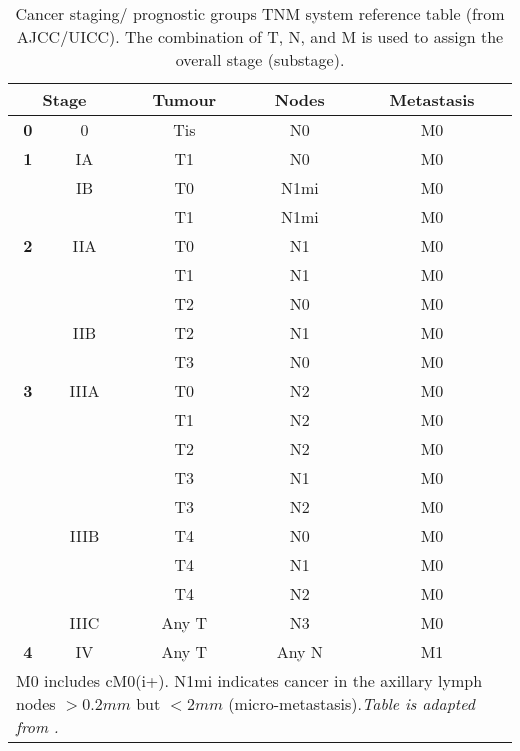         \begin{table}[!h]
        \centering
        \footnotesize
        \caption[Cancer staging/ prognostic groups TNM system reference table (from AJCC/UICC)]{Cancer staging/ prognostic groups TNM system reference table (from AJCC/UICC). The combination of T, N, and M is used to assign the  overall stage (substage).}
        \label{table:tnmstage}
        \begin{tabular}{c|c|c|c|c}
        \multicolumn{2}{c|}{\textbf{\small Stage}} & \textbf{Tumour} & \textbf{Nodes} & \textbf{Metastasis} \\ \hline
        \textbf{0} & 0 & Tis & N0 & M0 \\ \hline
        \textbf{1} & IA & T1 & N0 & M0 \\ \hline
        \textbf{} & IB & T0 & N1mi & M0 \\ \cline{2-5} 
        \textbf{} &  & T1 & N1mi & M0 \\ \hline
        \textbf{2} & IIA & T0 & N1 & M0 \\ \hline
        \textbf{} &  & T1 & N1 & M0 \\ \cline{2-5} 
        \textbf{} &  & T2 & N0 & M0 \\ \cline{2-5} 
        \textbf{} & IIB & T2 & N1 & M0 \\ \cline{2-5} 
        \textbf{} &  & T3 & N0 & M0 \\ \hline
        \textbf{3} & IIIA & T0 & N2 & M0 \\ \hline
         &  & T1 & N2 & M0 \\ \cline{2-5} 
         &  & T2 & N2 & M0 \\ \cline{2-5} 
         &  & T3 & N1 & M0 \\ \cline{2-5} 
         &  & T3 & N2 & M0 \\ \cline{2-5} 
         & IIIB & T4 & N0 & M0 \\ \cline{2-5} 
         &  & T4 & N1 & M0 \\ \cline{2-5} 
         &  & T4 & N2 & M0 \\ \cline{2-5} 
         & IIIC & Any T & N3 & M0 \\ \hline
        \textbf{4} & IV & Any T & Any N & M1 \\ \hline
        
        \hline
        \multicolumn{5}{l}{%
          \begin{minipage}{6cm}%
            \tiny M0 includes cM0(i+). N1mi indicates cancer in the axillary lymph nodes  $>0.2mm$ but $<2mm$ (micro-metastasis).\textit{Table is adapted from \cite{Giuliano2017}.} 
          \end{minipage}%
        }\\
        \end{tabular}
        \end{table}


